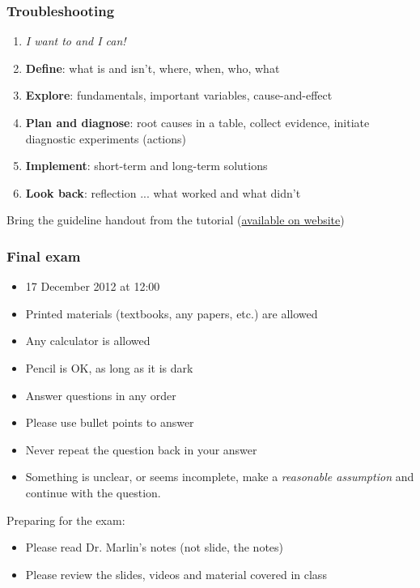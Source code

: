 \begin{frame}\frametitle{Troubleshooting}
	\begin{enumerate}
		\item	\emph{I want to and I can!}
		\item	\textbf{Define}: what is and isn't, where, when, who, what
		\item	\textbf{Explore}: fundamentals, important variables, cause-and-effect
		\item	\textbf{Plan and diagnose}: root causes in a table, collect evidence, initiate diagnostic experiments (actions)
		\item	\textbf{Implement}: short-term and long-term solutions
		\item	\textbf{Look back}: reflection ... what worked and what didn't
	\end{enumerate}
	\vspace{12pt}
	Bring the guideline handout from the tutorial (\href{http://learnche.mcmaster.ca/4N4/Process_troubleshooting_-_2012}{available on website})
\end{frame}

\begin{frame}\frametitle{Final exam}
	\begin{itemize}
		\item	17 December 2012 at 12:00
		\item	Printed materials (textbooks, any papers, etc.) are allowed
		\item	Any calculator is allowed
		\item	Pencil is OK, as long as it is dark
		\item	Answer questions in any order
		\item	Please use bullet points to answer
		\item	Never repeat the question back in your answer
		\item	Something is unclear, or seems incomplete, make a \emph{reasonable assumption} and continue with the question.
	\end{itemize}
	\vspace{12pt}
	Preparing for the exam:
	\begin{itemize}
		\item	Please read Dr. Marlin's notes (not slide, the notes)
		\item	Please review the slides, videos and material covered in class
	\end{itemize}
\end{frame}

